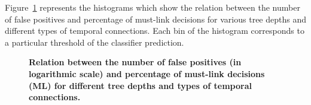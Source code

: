 Figure~\ref{fig:hist_fp} represents the histograms which show the relation between the number of false positives and percentage of must-link decisions for various tree depths and different types of temporal connections. 
Each bin of the histogram corresponds to a particular threshold of the classifier prediction. %
\begin{figure}[htbp]
\centering
{}
% 
\hfill
{}
\hfill
{}
\hfill
{}
% 
\caption[Relation between the number of false positives and percentage of must-link decisions]{
{\bf Relation between the number of false positives (in logarithmic scale) and percentage of must-link decisions (ML) for different tree depths and types of temporal connections.}}
\label{fig:hist_fp}
\end{figure}

